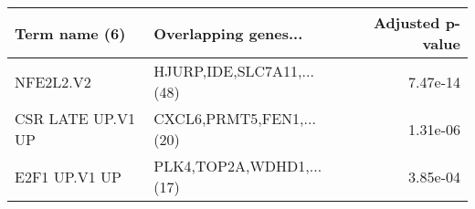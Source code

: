 \begin{tabular}{llr}
\toprule
    Term name (6) &      Overlapping genes... &  Adjusted p-value \\
\midrule
        NFE2L2.V2 & HJURP,IDE,SLC7A11,...(48) &          7.47e-14 \\
CSR LATE UP.V1 UP &  CXCL6,PRMT5,FEN1,...(20) &          1.31e-06 \\
    E2F1 UP.V1 UP &  PLK4,TOP2A,WDHD1,...(17) &          3.85e-04 \\
\bottomrule
\end{tabular}
